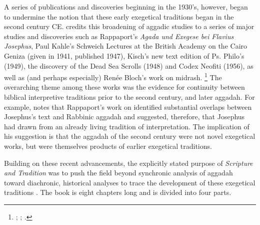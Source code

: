 A series of publications and discoveries beginning in the 1930's, however, began to undermine the notion that these early exegetical traditions began in the second century CE. \vermes credits this broadening of aggadic studies to a series of major studies and discoveries such as Rappaport's \emph{Agada und Exegese bei Flavius Josephus},%
    \autocite{rappaport1930}
Paul Kahle's Schweich Lectures at the British Academy on the Cairo Geniza (given in 1941, published 1947),%
    \autocite{kahle1947}
Kisch's new text edition of Ps. Philo's \lab (1949),%
    \autocite{kisch1949}
the discovery of the Dead Sea Scrolls (1948) and Codex Neofiti (1956), as well as (and perhaps especially) Renée Bloch's work on midrash.%
    \footnote{%
        \cite{bloch1954};
        \cite{bloch1955_repr};
        \cite[3--7]{vermes1961}.}
The overarching theme among these works was the evidence for continuity between biblical interpretive traditions prior to the second century, and later aggadah. For example, \vermes notes that Rappaport's work on \ant identified substantial overlaps between Josephus's text and Rabbinic aggadah and suggested, therefore, that Josephus had drawn from an already living tradition of interpretation. The implication of his suggestion is that the aggadah of the second century were not novel exegetical works, but were themselves products of earlier exegetical traditions. 

Building on these recent advancements, the explicitly stated purpose of \emph{Scripture and Tradition} was to push the field beyond synchronic analysis of aggadah toward diachronic, historical analyses to trace the development of these exegetical traditions \autocites[1]{vermes1961}[See also][]{bloch1955_repr}. The book is eight chapters long and is divided into four parts. 

